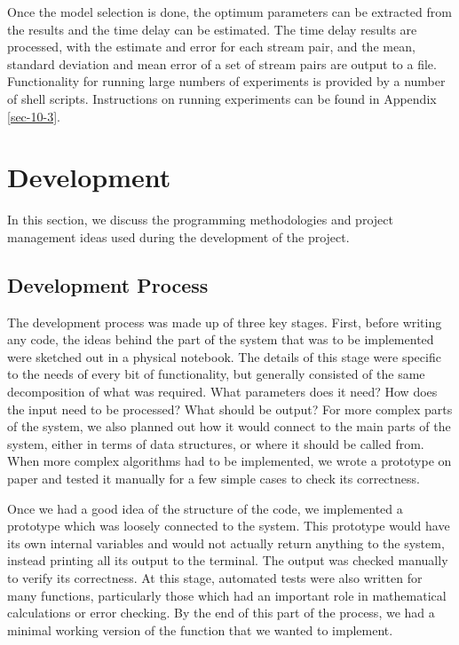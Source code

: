 \documentclass[a4paper,11pt]{article}
\begin{document}
   Once the model selection is done, the optimum parameters can be extracted
   from the results and the time delay can be estimated. The time delay results
   are processed, with the estimate and error for each stream pair, and the
   mean, standard deviation and mean error of a set of stream pairs are output
   to a file. Functionality for running large numbers of experiments is provided
   by a number of shell scripts. Instructions on running experiments can be
   found in Appendix \ref{sec-10-3}.
\section{Development}
\label{sec-7}

  In this section, we discuss the programming methodologies and project management
  ideas used during the development of the project.
\subsection{Development Process}
\label{sec-7-1}

   The development process was made up of three key stages. First, before
   writing any code, the ideas behind the part of the system that was to be
   implemented were sketched out in a physical notebook. The details of this
   stage were specific to the needs of every bit of functionality, but generally
   consisted of the same decomposition of what was required. What parameters
   does it need? How does the input need to be processed? What should be output?
   For more complex parts of the system, we also planned out how it would
   connect to the main parts of the system, either in terms of data structures,
   or where it should be called from. When more complex algorithms had to be
   implemented, we wrote a prototype on paper and tested it manually for a few
   simple cases to check its correctness.

   Once we had a good idea of the structure of the code, we implemented a
   prototype which was loosely connected to the system. This prototype would
   have its own internal variables and would not actually return anything to the
   system, instead printing all its output to the terminal. The output was
   checked manually to verify its correctness. At this stage, automated tests
   were also written for many functions, particularly those which had an
   important role in mathematical calculations or error checking. By the end of
   this part of the process, we had a minimal working version of the function
   that we wanted to implement.
\end{document}
